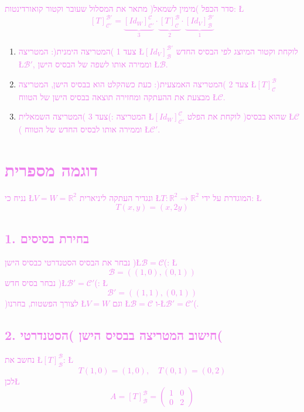 \documentclass[english,hebrew]{article}
\begin{document}
\textcolor{violet}{סדר הכפל )מימין לשמאל( מתאר את המסלול שעובר וקטור
קואורדינטות: \L{%
\[
[T]_{\mathcal{C}'}^{\mathcal{B}'}=\underbrace{[Id_{W}]_{\mathcal{C}'}^{\mathcal{C}}}_{\text{3}}\cdot\underbrace{[T]_{\mathcal{C}}^{\mathcal{B}}}_{\text{2}}\cdot\underbrace{[Id_{V}]_{\mathcal{B}}^{\mathcal{B}'}}_{\text{1}}
\]
}%
}
\begin{enumerate}
\item \textcolor{violet}{צעד 1 )המטריצה הימנית(: המטריצה \L{$[Id_{V}]_{\mathcal{B}}^{\mathcal{B}'}$}
לוקחת וקטור המיוצג לפי הבסיס החדש \L{$\mathcal{B}'$}, וממירה אותו
לשפה של הבסיס הישן \L{$\mathcal{B}$}. }
\item \textcolor{violet}{צעד 2 )המטריצה האמצעית(: כעת כשהקלט הוא בבסיס הישן,
המטריצה \L{$[T]_{\mathcal{C}}^{\mathcal{B}}$} מבצעת את ההעתקה ומחזירה
תוצאה בבסיס הישן של הטווח \L{$\mathcal{C}$}. }
\item \textcolor{violet}{צעד 3 )המטריצה השמאלית(: המטריצה \L{$[Id_{W}]_{\mathcal{C}'}^{\mathcal{C}}$}
לוקחת את הפלט )שהוא בבסיס \L{$\mathcal{C}$}( וממירה אותו לבסיס החדש
של הטווח \L{$\mathcal{C}'$}. }
\end{enumerate}

\section*{\textcolor{violet}{דוגמה מספרית}}

\textcolor{violet}{נניח כי \L{$V=W=\mathbb{R}^{2}$} ונגדיר העתקה
ליניארית \L{$T:\mathbb{R}^{2}\to\mathbb{R}^{2}$} המוגדרת על ידי:
\L{%
\[
T(x,y)=(x,2y)
\]
}%
}

\subsection*{\textcolor{violet}{1. בחירת בסיסים}}

\textcolor{violet}{נבחר את הבסיס הסטנדרטי כבסיס הישן )\L{$\mathcal{B}=\mathcal{C}$}(:
\L{%
\[
\mathcal{B}=((1,0),(0,1))
\]
}%
נבחר בסיס חדש )\L{$\mathcal{B}'=\mathcal{C}'$}(: \L{%
\[
\mathcal{B}'=((1,1),(0,1))
\]
}%
)לצורך הפשטות, בחרנו \L{$V=W$} וגם \L{$\mathcal{B}=\mathcal{C}$}
ו-\L{$\mathcal{B}'=\mathcal{C}'$}(.}

\subsection*{\textcolor{violet}{2. חישוב המטריצה בבסיס הישן )הסטנדרטי(}}

\textcolor{violet}{נחשב את \L{$[T]_{\mathcal{B}}^{\mathcal{B}}$}:
\L{%
\[
T(1,0)=(1,0),\quad T(0,1)=(0,2)
\]
}%
לכן\L{%
\[
A=[T]_{\mathcal{B}}^{\mathcal{B}}=\begin{pmatrix}1 & 0\\
0 & 2
\end{pmatrix}
\]
}%
}
\end{document}
